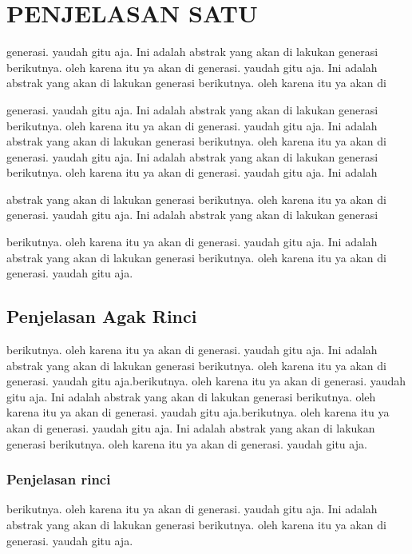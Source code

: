 \section{PENJELASAN SATU}
generasi. yaudah gitu aja. Ini adalah abstrak yang akan di lakukan generasi berikutnya. oleh karena itu ya akan di generasi. yaudah gitu aja. Ini adalah abstrak yang akan di lakukan generasi berikutnya. oleh karena itu ya akan di


generasi. yaudah gitu aja. Ini adalah abstrak yang akan di lakukan generasi berikutnya. oleh karena itu ya akan di generasi. yaudah gitu aja. Ini adalah abstrak yang akan di lakukan generasi berikutnya. oleh karena itu ya akan di generasi. yaudah gitu aja. Ini adalah abstrak yang akan di lakukan generasi berikutnya. oleh karena itu ya akan di generasi. yaudah gitu aja. Ini adalah
 
abstrak yang akan di lakukan generasi berikutnya. oleh karena itu ya akan di generasi. yaudah gitu aja. Ini adalah abstrak yang akan di lakukan generasi  


berikutnya. oleh karena itu ya akan di generasi. yaudah gitu aja. Ini adalah abstrak yang akan di lakukan generasi berikutnya. oleh karena itu ya akan di generasi. yaudah gitu aja.

\subsection{Penjelasan Agak Rinci}
berikutnya. oleh karena itu ya akan di generasi. yaudah gitu aja. Ini adalah abstrak yang akan di lakukan generasi berikutnya. oleh karena itu ya akan di generasi. yaudah gitu aja.berikutnya. oleh karena itu ya akan di generasi. yaudah gitu aja. Ini adalah abstrak yang akan di lakukan generasi berikutnya. oleh karena itu ya akan di generasi. yaudah gitu aja.berikutnya. oleh karena itu ya akan di generasi. yaudah gitu aja. Ini adalah abstrak yang akan di lakukan generasi berikutnya. oleh karena itu ya akan di generasi. yaudah gitu aja.
\subsubsection{Penjelasan rinci}
berikutnya. oleh karena itu ya akan di generasi. yaudah gitu aja. Ini adalah abstrak yang akan di lakukan generasi berikutnya. oleh karena itu ya akan di generasi. yaudah gitu aja.
